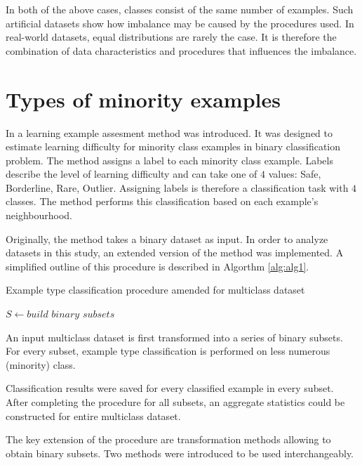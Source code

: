 \documentclass[12pt]{article}
\begin{document}
In both of the above cases, classes consist of the same number of examples. Such artificial datasets show how imbalance may be caused by the procedures used. In real-world datasets, equal distributions are rarely the case. It is therefore the combination of data characteristics and procedures that influences the imbalance.

\section{Types of minority examples}

In \cite{Napierala2016} a learning example assesment method was introduced. It was designed to estimate learning difficulty for minority class examples in binary classification problem. The method assigns a label to each minority class example. Labels describe the level of learning difficulty and can take one of $4$ values: Safe, Borderline, Rare, Outlier. Assigning labels is therefore a classification task with $4$ classes. The method performs this classification based on each example's neighbourhood.

Originally, the method takes a binary dataset as input. In order to analyze datasets in this study, an extended version of the method was implemented. A simplified outline of this procedure is described in Algorthm \ref{alg:alg1}.

\begin{algorithm}
\caption{Example type classification procedure amended for multiclass dataset}
\begin{algorithmic}
	\State $S \gets build$ $binary$ $subsets$
	\EndFor
\end{algorithmic}
\label{alg:alg1}
\end{algorithm}

An input multiclass dataset is first transformed into a series of binary subsets. For every subset, example type classification is performed on less numerous (minority) class. 

Classification results were saved for every classified example in every subset. After completing the procedure for all subsets, an aggregate statistics could be constructed for entire multiclass dataset.

The key extension of the procedure are transformation methods allowing to obtain binary subsets. Two methods were introduced to be used interchangeably.
\end{document}
